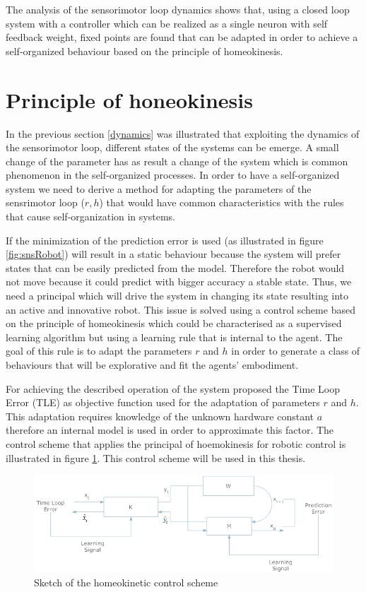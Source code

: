 \documentclass[msc,ai,logo]{infthesis}
\begin{document}
The analysis of the sensorimotor loop dynamics shows that, using a closed loop system with a controller which can be realized as a single neuron with self feedback weight, fixed points are found that can be adapted in order to achieve a self-organized behaviour based on the principle of homeokinesis. 
\label{dynamics}
\section{Principle of honeokinesis}
In the previous section \ref{dynamics} was illustrated that exploiting the dynamics of the sensorimotor loop, different states of the systems can be emerge. A small change of the parameter has as result a change of the system which is common phenomenon in the self-organized processes. In order to have a self-organized system we need to derive a method for adapting the parameters of the sensrimotor loop ($r,h$) that would have common characteristics with the rules that cause self-organization in systems.   

If the minimization of the prediction error is used (as illustrated in figure \ref{fig:snsRobot}) will result in a static behaviour because the system will prefer states that can be easily predicted from the model. Therefore the robot would not move because it could predict with bigger accuracy a stable state. Thus, we need a principal which will drive the system in changing its state resulting into an active and innovative robot. This issue is solved using a control scheme based on the principle of homeokinesis which could be characterised as a supervised learning algorithm but using a learning rule that is internal to the agent. The goal of this rule is to adapt the parameters $r$ and $h$ in order to generate a class of behaviours that will be explorative and fit the agents' embodiment.

 For achieving the described operation of the system \cite{derlieb02} proposed the Time Loop Error (TLE) as objective function used for the adaptation of parameters $r$ and $h$. This adaptation requires knowledge of the unknown hardware constant $a$ therefore an internal model is used in order to approximate this factor. The control scheme that applies the principal of hoemokinesis for robotic control is illustrated in figure \ref{fig:homeo}. This control scheme will be used in this thesis.

\begin{figure}[H]
\includegraphics[scale=0.75]{homeo.png}
\centering
\caption{Sketch of the homeokinetic control scheme }
\label{fig:homeo}
\end{figure}
\end{document}
